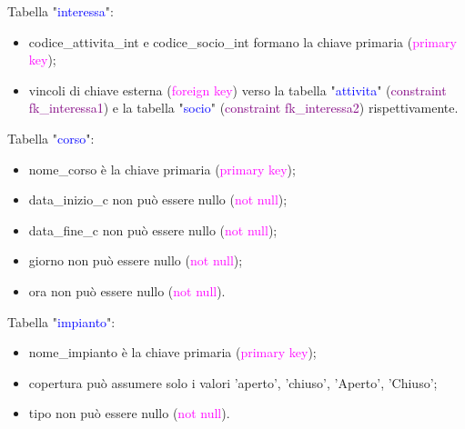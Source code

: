\documentclass{article}
\begin{document}
    \begin{flushleft}
        Tabella "\textcolor{blue}{interessa}": \\
        \begin{itemize}
            \item codice\_attivita\_int e codice\_socio\_int formano la chiave primaria (\textcolor{magenta}{primary key}); \\
            \item vincoli di chiave esterna (\textcolor{magenta}{foreign key}) verso la tabella "\textcolor{blue}{attivita}" (\textcolor{purple}{constraint fk\_interessa1}) e la tabella "\textcolor{blue}{socio}" (\textcolor{purple}{constraint fk\_interessa2}) rispettivamente. \\
        \end{itemize}        
    \end{flushleft}

    \begin{flushleft}
        Tabella "\textcolor{blue}{corso}": \\
        \begin{itemize}
            \item nome\_corso è la chiave primaria (\textcolor{magenta}{primary key}); \\
            \item data\_inizio\_c non può essere nullo (\textcolor{magenta}{not null}); \\
            \item data\_fine\_c non può essere nullo (\textcolor{magenta}{not null}); \\
            \item giorno non può essere nullo (\textcolor{magenta}{not null}); \\
            \item ora non può essere nullo (\textcolor{magenta}{not null}). \\
        \end{itemize}        
    \end{flushleft}

    \begin{flushleft}
        Tabella "\textcolor{blue}{impianto}": \\
        \begin{itemize}
            \item nome\_impianto è la chiave primaria (\textcolor{magenta}{primary key}); \\
            \item copertura può assumere solo i valori 'aperto', 'chiuso', 'Aperto', 'Chiuso'; \\
            \item tipo non può essere nullo (\textcolor{magenta}{not null}). \\
        \end{itemize}        
    \end{flushleft}
\end{document}
